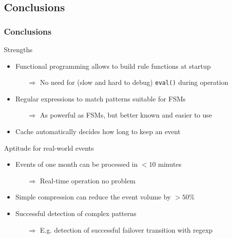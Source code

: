 \documentclass[10pt]{beamer}
\begin{document}
\subsection{Conclusions}
\begin{frame}
	\frametitle{Conclusions}
	\begin{block}{Strengths}
		\begin{itemize}
			\item Functional programming allows to build rule functions at
				startup
				\begin{itemize}
					\item[$\Rightarrow$] No need for (slow and hard to debug)
						\texttt{eval()} during operation
		 		\end{itemize}
			\item Regular expressions to match patterns suitable for FSMs
				\begin{itemize}
					\item[$\Rightarrow$] As powerful as FSMs, but better known
						and easier to use
				\end{itemize}
			\item Cache automatically decides how long to keep an event
		\end{itemize}
	\end{block}
	\begin{block}{Aptitude for real-world events}
		\begin{itemize}
			\item Events of one month can be processed in $< 10$ minutes
				\begin{itemize}
					\item[$\Rightarrow$] Real-time operation no problem
				\end{itemize}
			\item Simple compression can reduce the event volume by  $> 50\%$
			\item Successful detection of complex patterns
				\begin{itemize}
					\item[$\Rightarrow$] E.g. detection of successful failover
						transition with regexp
				\end{itemize}
		\end{itemize}
	\end{block}
\end{frame}
\end{document}
